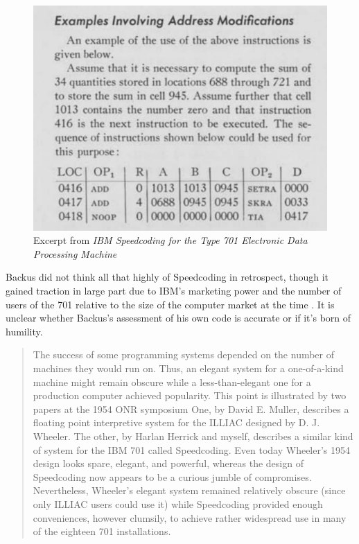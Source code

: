 \begin{figure}[h!]
  \centering
  \includegraphics[width=0.5\linewidth]{resource/ibm-speedcoding-example.png}
  \caption{Excerpt from \textit{IBM Speedcoding for the Type 701
    Electronic Data Processing Machine}
  \cite{IBM_1954_Speedcoding}}
  \label{fig:ibm-speedcoding-example}
\end{figure}

Backus did not think all that highly of Speedcoding in retrospect, though it
gained traction in large part due to IBM's marketing power and the number of
users of the 701 relative to the size of the computer market at the time
\cite{Backus_1980_Programming_in_America_in_1950s}. It is unclear whether
Backus's assessment of his own code is accurate or if it's born of humility.

\begin{quotation}
  The success of some programming systems depended on the number of machines
  they would run on. Thus, an elegant system for a one-of-a-kind machine might
  remain obscure while a less-than-elegant one for a production
  computer achieved
  popularity. This point is illustrated by two papers at the 1954 ONR symposium
  One, by David E. Muller, describes a floating point interpretive system for
  the ILLIAC designed by D. J. Wheeler. The other, by Harlan Herrick and myself,
  describes a similar kind of system for the IBM 701 called Speedcoding. Even
  today Wheeler's 1954 design looks spare, elegant, and powerful, whereas the
  design of Speedcoding now appears to be a curious jumble of compromises.
  Nevertheless, Wheeler's elegant system remained relatively obscure (since only
  ILLIAC users could use it) while Speedcoding provided enough conveniences,
  however clumsily, to achieve rather widespread use in many of the eighteen 701
  installations.
\end{quotation}

